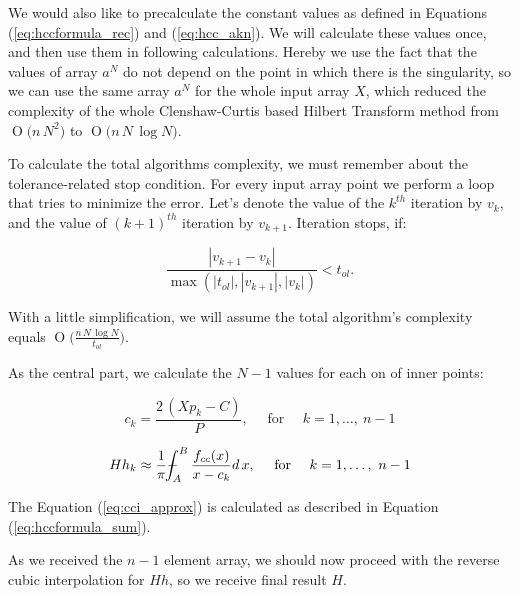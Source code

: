 \documentclass[12pt,twoside,a4paper]{article}
\numberwithin{equation}{subsection}
\numberwithin{figure}{subsection}
\def\Xint#1{\mathchoice
{\XXint\displaystyle\textstyle{#1}}%
{\XXint\textstyle\scriptstyle{#1}}%
{\XXint\scriptstyle\scriptscriptstyle{#1}}%
{\XXint\scriptscriptstyle\scriptscriptstyle{#1}}%
\!\int}
\def\XXint#1#2#3{{\setbox0=\hbox{$#1{#2#3}{\int}$ }\vcenter{\hbox{$#2#3$ }}\kern-.6\wd0}}
\def\dashint{\Xint-}
\newcommand{\BigO}[1]{\ensuremath{\operatorname{O}\bigl(#1\bigr)}}
\begin{document}
We would also like to precalculate the constant values as defined in Equations (\ref{eq:hccformula_rec}) and (\ref{eq:hcc_akn}). We will calculate these values once, and then use them in following calculations. Hereby we use the fact that the values of array $a^N$ do not depend on the point in which there is the singularity, so we can use the same array $a^N$ for the whole input array $X$, which reduced the complexity of the whole Clenshaw-Curtis based Hilbert Transform method from $\BigO{n \, N^2 }$ to $\BigO{n \, N \, \log{N}}$. 

To calculate the total algorithms complexity, we must remember about the tolerance-related stop condition. For every input array point we perform a loop that tries to minimize the error. Let's denote the value of the $k^{th}$ iteration by $v_k$, and the value of $(k+1)^{th}$ iteration by $v_{k+1}$. Iteration stops, if:

\begin{equation}
  \frac{|v_{k+1} - v_k|} {\max\left(|t_{ol}|, |v_{k+1}|, |v_k| \right)} < t_{ol} .
\end{equation}

With a little simplification, we will assume the total algorithm's complexity equals $\BigO{\frac{n \, N \, \log{N}}{t_{ol}} }$. 

As the central part, we calculate the $N-1$ values for each on of inner points: 

\begin{equation} \label{eq:cci_newd}
	c_k = \frac{2 \, (Xp_k - C ) }{P}, \quad \text{ for } \quad k = 1, \ldots, \ n-1
\end{equation}

\begin{equation} \label{eq:cci_approx}
  Hh_k \approx \frac{1}{\pi} \dashint_{A}^{B} \frac{f_{cc}(x)}{x - c_k} d \, x, \quad \text{ for } \quad k = 1,
  \ldots , \ n-1
\end{equation}

The Equation (\ref{eq:cci_approx}) is calculated as described in Equation (\ref{eq:hccformula_sum}).

As we received the $n-1$ element array, we should now proceed with the reverse cubic interpolation for $Hh$, so we receive final result $H$.
\end{document}
